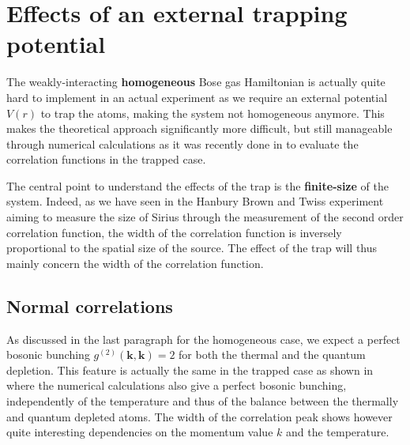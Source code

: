 \section{Effects of an external trapping potential}
  
The weakly-interacting \textbf{homogeneous} Bose gas Hamiltonian is actually quite hard to implement in an actual experiment as we require an external potential $V(r)$ to trap the atoms, making the system not homogeneous anymore. This makes the theoretical approach significantly more difficult, but still manageable through numerical calculations as it was recently done in \cite{butera2020} to evaluate the correlation functions in the trapped case.

The central point to understand the effects of the trap is the \textbf{finite-size} of the system. Indeed, as we have seen in the Hanbury Brown and Twiss experiment aiming to measure the size of Sirius through the measurement of the second order correlation function, the width of the correlation function is inversely proportional to the spatial size of the source. The effect of the trap will thus mainly concern the width of the correlation function.

\subsection{Normal correlations}

As discussed in the last paragraph for the homogeneous case, we expect a perfect bosonic bunching $g^{(2)}(\bm{k},\bm{k})=2$ for both the thermal and the quantum depletion. This feature is actually the same in the trapped case as shown in \cite{butera2020} where the numerical calculations also give a perfect bosonic bunching, independently of the temperature and thus of the balance between the thermally and quantum depleted atoms. The width of the correlation peak shows however quite interesting dependencies on the momentum value $k$ and the temperature.

